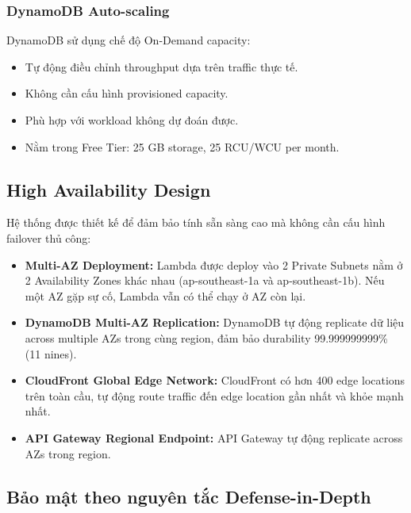 \subsubsection{DynamoDB Auto-scaling}

DynamoDB sử dụng chế độ On-Demand capacity:

\begin{itemize}
    \item Tự động điều chỉnh throughput dựa trên traffic thực tế.
    \item Không cần cấu hình provisioned capacity.
    \item Phù hợp với workload không dự đoán được.
    \item Nằm trong Free Tier: 25 GB storage, 25 RCU/WCU per month.
\end{itemize}

\subsection{High Availability Design}
\label{ssec:high_availability}

Hệ thống được thiết kế để đảm bảo tính sẵn sàng cao mà không cần cấu hình failover thủ công:

\begin{itemize}
    \item \textbf{Multi-AZ Deployment:} Lambda được deploy vào 2 Private Subnets nằm ở 2 Availability Zones khác nhau (ap-southeast-1a và ap-southeast-1b). Nếu một AZ gặp sự cố, Lambda vẫn có thể chạy ở AZ còn lại.
    
    \item \textbf{DynamoDB Multi-AZ Replication:} DynamoDB tự động replicate dữ liệu across multiple AZs trong cùng region, đảm bảo durability 99.999999999\% (11 nines).
    
    \item \textbf{CloudFront Global Edge Network:} CloudFront có hơn 400 edge locations trên toàn cầu, tự động route traffic đến edge location gần nhất và khỏe mạnh nhất.
    
    \item \textbf{API Gateway Regional Endpoint:} API Gateway tự động replicate across AZs trong region.
\end{itemize}

\subsection{Bảo mật theo nguyên tắc Defense-in-Depth}
\label{ssec:security_layers}

